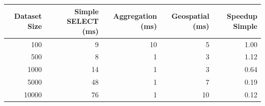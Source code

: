 \begin{tabular}{rrrrr}
\toprule
Dataset Size & Simple SELECT (ms) & Aggregation (ms) & Geospatial (ms) & Speedup Simple \\
\midrule
100 & 9 & 10 & 5 & 1.00 \\
500 & 8 & 1 & 3 & 1.12 \\
1000 & 14 & 1 & 3 & 0.64 \\
5000 & 48 & 1 & 7 & 0.19 \\
10000 & 76 & 1 & 10 & 0.12 \\
\bottomrule
\end{tabular}
